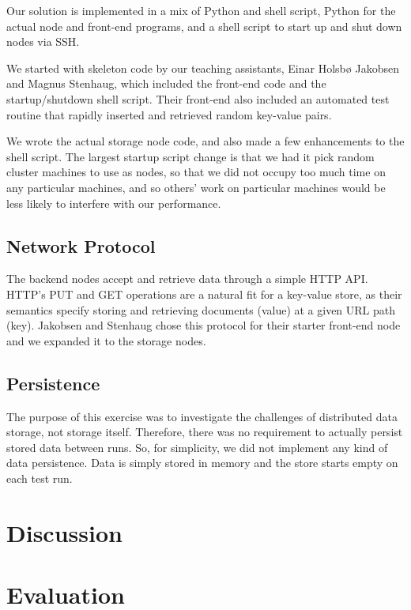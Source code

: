 \documentclass[11pt,conference]{IEEEtran}
\begin{document}
Our solution is implemented in a mix of Python and shell script, Python for the
actual node and front-end programs, and a shell script to start up and shut down
nodes via SSH.

We started with skeleton code by our teaching assistants, Einar Holsbø Jakobsen
and Magnus Stenhaug, which included the front-end code and the startup/shutdown
shell script. Their front-end also included an automated test routine that
rapidly inserted and retrieved random key-value pairs.

We wrote the actual storage node code, and also made a few enhancements to the
shell script. The largest startup script change is that we had it pick random
cluster machines to use as nodes, so that we did not occupy too much time on any
particular machines, and so others' work on particular machines would be less
likely to interfere with our performance.


\subsection{Network Protocol}

The backend nodes accept and retrieve data through a simple HTTP API. HTTP's PUT
and GET operations are a natural fit for a key-value store, as their semantics
specify storing and retrieving documents (value) at a given URL path (key).
Jakobsen and Stenhaug chose this protocol for their starter front-end node and
we expanded it to the storage nodes.


\subsection{Persistence}

The purpose of this exercise was to investigate the challenges of distributed
data storage, not storage itself. Therefore, there was no requirement to
actually persist stored data between runs. So, for simplicity, we did not
implement any kind of data persistence. Data is simply stored in memory and the
store starts empty on each test run.



\section{Discussion}




\section{Evaluation}
\end{document}
